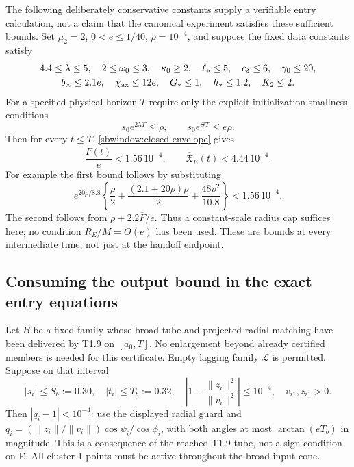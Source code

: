 \documentclass{article} %
\theoremstyle{plain}
\theoremstyle{definition}
\theoremstyle{remark}
\begin{document}
The following deliberately conservative constants supply a verifiable
entry calculation, not a claim that the canonical experiment satisfies
these sufficient bounds. Set $\mu_2=2$, $0<e\le1/40$, $\rho=10^{-4}$,
and suppose the fixed data constants satisfy
\begin{equation}\label{sbwindow:data-size}
 \begin{gathered}
 4.4\le\lambda\le5,\quad 2\le\omega_0\le3,\quad
 \kappa_0\ge2,\quad \ell_*\le5,\quad c_\delta\le6,\quad
 \gamma_0\le20,\\
 b_\times\le2.1e,\quad \chi_{\rm ax}\le12e,\quad
 G_*\le1,\quad h_*\le1.2,\quad K_2\le2.
 \end{gathered}
\end{equation}
For a specified physical horizon $T$ require only the explicit
initialization smallness conditions
\begin{equation}\label{sbwindow:initial-smallness}
 s_0e^{2\lambda T}\le\rho,\qquad
 s_0e^{\Theta T}\le e\rho.
\end{equation}
Then for every $t\le T$, \eqref{sbwindow:closed-envelope} gives
\begin{equation}\label{sbwindow:small-charge}
 \frac{\overline F(t)}e<1.56\,10^{-4},\qquad
 \overline{\mathfrak X}_E(t)<4.44\,10^{-4}.
\end{equation}
For example the first bound follows by substituting
\[
 e^{20\rho/8.8}\left\{\frac\rho2+
                \frac{(2.1+20\rho)\rho}{2}
                    +\frac{48\rho^2}{10.8}\right\}<1.56\,10^{-4}.
\]
The second follows from $\rho+2.2\overline F/e$.
Thus a constant-scale radius cap suffices here; no condition
$R_E/M=O(e)$ has been used. These are bounds at every intermediate time,
not just at the handoff endpoint.

\subsection{Consuming the output bound in the exact entry equations}

Let $B$ be a fixed family whose broad tube and projected radial matching
have been delivered by T1.9 on $[a_0,T]$. No enlargement beyond already
certified members is needed for this certificate. Empty lagging family
$\mathcal L$ is permitted. Suppose on that interval
\begin{equation}\label{sbwindow:tube}
 |s_i|\le S_b:=0.30,\quad |t_i|\le T_b:=0.32,\quad
 \left|1-\frac{\|z_i\|^2}{\|v_i\|^2}\right|\le10^{-4},
 \quad v_{i1},z_{i1}>0.
\end{equation}
Then $|q_i-1|<10^{-4}$: use the displayed radial guard and
$q_i=(\|z_i\|/\|v_i\|)\cos\psi_i/\cos\phi_i$,
with both angles at most $\arctan(eT_b)$ in magnitude.
This is a consequence of the reached T1.9 tube, not a sign condition on E.
All cluster-1 points must be active throughout the broad input cone.
\end{document}
